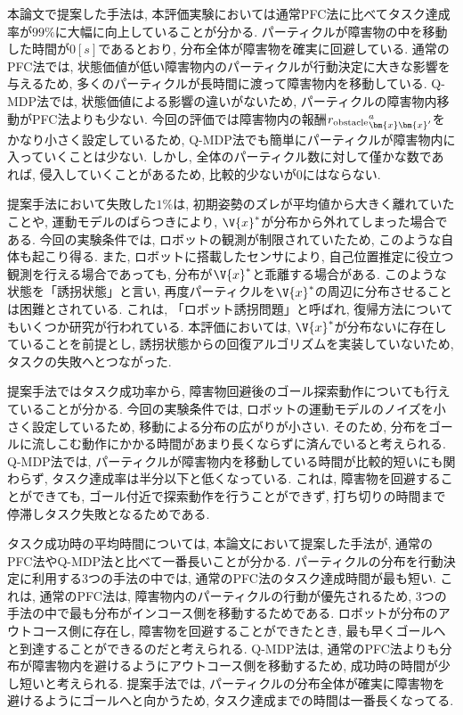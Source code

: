 本論文で提案した手法は, 本評価実験においては通常PFC法に比べてタスク達成率が$99\%$に大幅に向上していることが分かる. 
パーティクルが障害物の中を移動した時間が$0[\si{s}]$であるとおり, 分布全体が障害物を確実に回避している. 
通常のPFC法では, 状態価値が低い障害物内のパーティクルが行動決定に大きな影響を与えるため, 
多くのパーティクルが長時間に渡って障害物内を移動している. 
Q-MDP法では, 状態価値による影響の違いがないため, パーティクルの障害物内移動がPFC法よりも少ない. 
今回の評価では障害物内の報酬${r_{\rm obstacle}}^{a}_{\bm{x}\bm{x}^{\prime}}$をかなり小さく設定しているため, 
Q-MDP法でも簡単にパーティクルが障害物内に入っていくことは少ない. 
しかし, 全体のパーティクル数に対して僅かな数であれば, 侵入していくことがあるため, 比較的少ないが$0$にはならない. 

提案手法において失敗した$1\%$は, 初期姿勢のズレが平均値から大きく離れていたことや, 運動モデルのばらつきにより, 
$\V{x}^{*}$が分布から外れてしまった場合である. 
今回の実験条件では, ロボットの観測が制限されていたため, このような自体も起こり得る. 
また, ロボットに搭載したセンサにより, 自己位置推定に役立つ観測を行える場合であっても, 分布が$\V{x}^{*}$と乖離する場合がある. 
このような状態を「誘拐状態」と言い, 再度パーティクルを$\V{x}^{*}$の周辺に分布させることは困難とされている. 
これは, 「ロボット誘拐問題」と呼ばれ, 復帰方法についてもいくつか研究が行われている\cite{lenser2000etal, aa}. 
本評価においては, $\V{x}^{*}$が分布ないに存在していることを前提とし, 誘拐状態からの回復アルゴリズムを実装していないため, 
タスクの失敗へとつながった. 

提案手法ではタスク成功率から, 障害物回避後のゴール探索動作についても行えていることが分かる. 
今回の実験条件では, ロボットの運動モデルのノイズを小さく設定しているため, 移動による分布の広がりが小さい. 
そのため, 分布をゴールに流しこむ動作にかかる時間があまり長くならずに済んでいると考えられる. 
Q-MDP法では, パーティクルが障害物内を移動している時間が比較的短いにも関わらず, タスク達成率は半分以下と低くなっている. 
これは, 障害物を回避することができても, ゴール付近で探索動作を行うことができず, 打ち切りの時間まで停滞しタスク失敗となるためである. 

タスク成功時の平均時間については, 本論文において提案した手法が, 通常のPFC法やQ-MDP法と比べて一番長いことが分かる. 
パーティクルの分布を行動決定に利用する3つの手法の中では, 通常のPFC法のタスク達成時間が最も短い. 
これは, 通常のPFC法は, 障害物内のパーティクルの行動が優先されるため, 3つの手法の中で最も分布がインコース側を移動するためである. 
ロボットが分布のアウトコース側に存在し, 障害物を回避することができたとき, 最も早くゴールへと到達することができるのだと考えられる. 
Q-MDP法は, 通常のPFC法よりも分布が障害物内を避けるようにアウトコース側を移動するため, 成功時の時間が少し短いと考えられる. 
提案手法では, パーティクルの分布全体が確実に障害物を避けるようにゴールへと向かうため, タスク達成までの時間は一番長くなってる. 

